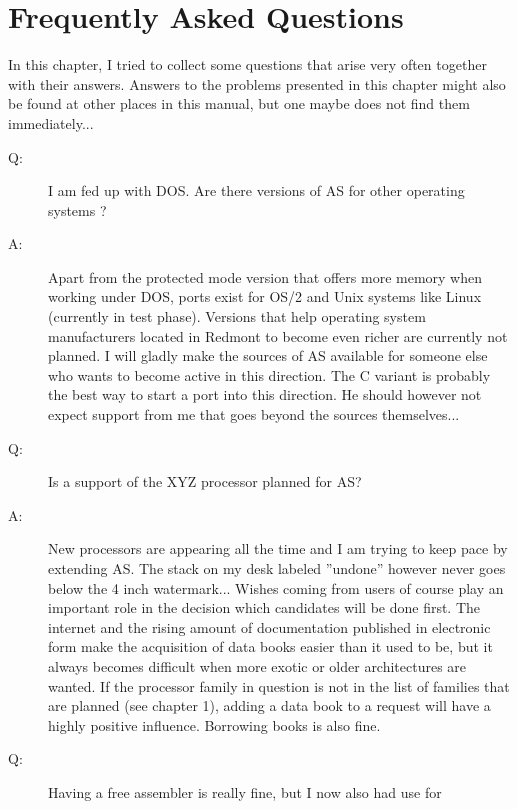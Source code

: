 \documentclass[12pt,twoside]{report}
\begin{document}

\cleardoublepage
\chapter{Frequently Asked Questions}

In this chapter, I tried to collect some questions that arise very often
together with their answers.  Answers to the problems presented in
this chapter might also be found at other places in this manual, but
one maybe does not find them immediately...

\begin{description}
\item[Q:]{I am fed up with DOS.  Are there versions of AS for other
   operating systems ?}
\item[A:]{Apart from the protected mode version that offers more memory when
   working under DOS, ports exist for OS/2 and Unix systems like
   Linux (currently in test phase).  Versions that help operating
   system manufacturers located in Redmont to become even richer are
   currently not planned.  I will gladly make the sources of AS
   available for someone else who wants to become active in this
   direction.  The C variant is probably the best way to start a
   port into this direction.  He should however not expect support
   from me that goes beyond the sources themselves...}
\vspace{0.3cm}
\item[Q:]{Is a support of the XYZ processor planned for AS?}
\item[A:]{New processors are appearing all the time and I am trying to keep
   pace by extending AS.  The stack on my desk labeled ''undone''
   however never goes below the 4 inch watermark... Wishes coming
   from users of course play an important role in the decision which
   candidates will be done first.  The internet and the rising amount
   of documentation published in electronic form make the acquisition
   of data books easier than it used to be, but it always becomes
   difficult when more exotic or older architectures are wanted.  If
   the processor family in question is not in the list of families
   that are planned (see chapter 1), adding a data book to a request
   will have a highly positive influence.  Borrowing books is also
   fine.}
\vspace{0.3cm}
\item[Q:]{Having a free assembler is really fine, but I now also had use for
}
\end{description}
\end{document}

